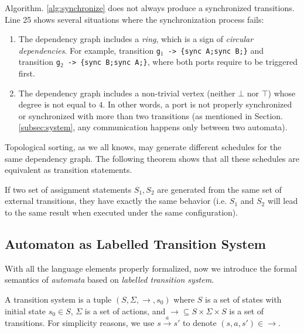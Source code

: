 Algorithm. \ref{alg:synchronize} does not always produce a synchronized transitions. Line 25 shows several situations where the synchronization process fails:
\begin{enumerate}
    \item The dependency graph includes a \emph{ring}, which is a sign of \emph{circular dependencies}. For example, transition \texttt{g$_1$ -> \{sync A;sync B;\}} and transition \texttt{g$_2$ -> \{sync B;sync A;\}}, where both ports require to be triggered first.
    \item The dependency graph includes a non-trivial vertex (neither $\bot$ nor $\top$) whose degree is not equal to $4$. In other words, a port is not properly synchronized or synchronized with more than two transitions (as mentioned in Section. \ref{subsec:system}, any communication happens only between two automata).
\end{enumerate}

Topological sorting, as we all knows, may generate different schedules for the same dependency graph. The following theorem shows that all these schedules are equivalent as transition statements.

\begin{theorem} If two set of assignment statements $S_1, S_2$ are generated from the same set of external transitions, they have exactly the same behavior (i.e. $S_1$ and $S_2$ will lead to the same result when executed under the same configuration).
\end{theorem}

\subsection{Automaton as Labelled Transition System}

With all the language elements properly formalized, now we introduce the formal semantics of \emph{automata} based on \emph{labelled transition system}.

\begin{definition}
    A transition system is a tuple $(S,\Sigma,\rightarrow,s_0)$ where $S$ is a set of states with initial state $s_0\in S$, $\Sigma$ is a set of actions, and $\rightarrow\subseteq S\times\Sigma\times S$ is a set of transitions. For simplicity reasons, we use $s\xrightarrow{a} s'$ to denote $(s,a,s')\in\rightarrow$.
\end{definition}

